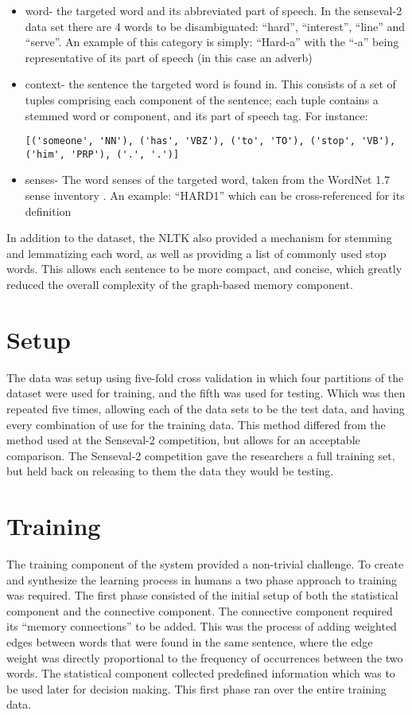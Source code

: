 \begin{itemize}
	\item word- the targeted word and its abbreviated part of speech. In the senseval-2 data set there are 4 words to be disambiguated: ``hard'', ``interest'', ``line'' and ``serve''. An example of this category is simply: ``Hard-a'' with the ``-a'' being representative of its part of speech (in this case an adverb)
	\item context- the sentence the targeted word is found in. This consists of a set of tuples comprising each component of the sentence; each tuple contains a stemmed word or component, and its part of speech tag. For instance: \begin{verbatim}[('someone', 'NN'), ('has', 'VBZ'), ('to', 'TO'), ('stop', 'VB'), ('him', 'PRP'), ('.', '.')] \end{verbatim}
	\item senses- The word senses of the targeted word, taken from the WordNet 1.7 sense inventory . An example: ``HARD1'' which can be cross-referenced for its definition
\end{itemize}

In addition to the dataset, the NLTK also provided a mechanism for stemming and lemmatizing each word, as well as providing a list of commonly used stop words. This allows each sentence to be more compact, and concise, which greatly reduced the overall complexity of the graph-based memory component.

\section{Setup}

The data was setup using five-fold cross validation in which four partitions of the dataset were used for training, and the fifth was used for testing. Which was then repeated five times, allowing each of the data sets to be the test data, and having every combination of use for the training data.  This method differed from the method used at the Senseval-2 competition, but allows for an acceptable comparison.  The Senseval-2 competition gave the researchers a full training set, but held back on releasing to them the data they would be testing.  

\section{Training}

The training component of the system provided a non-trivial challenge.  To create and synthesize the learning process in humans a two phase approach to training was required.  The first phase consisted of the initial setup of both the statistical component and the connective component. The connective component required its ``memory connections'' to be added.  This was the process of adding weighted edges between words that were found in the same sentence, where the edge weight was directly proportional to the frequency of occurrences between the two words.  The statistical component collected predefined information which was to be used later for decision making.  This first phase ran over the entire training data. 

